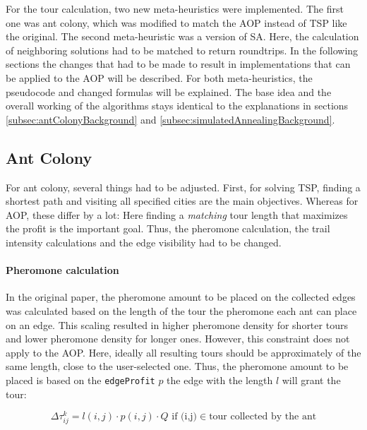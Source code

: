 For the tour calculation, two new meta-heuristics were implemented.
The first one was ant colony, which was modified to match the AOP instead of TSP like the original.
The second meta-heuristic was a version of SA.
Here, the calculation of neighboring solutions had to be matched to return roundtrips.
In the following sections the changes that had to be made to result in implementations that can be applied to the AOP will be described.
For both meta-heuristics, the pseudocode and changed formulas will be explained.
The base idea and the overall working of the algorithms stays identical to the explanations in sections \ref{subsec:antColonyBackground} and \ref{subsec:simulatedAnnealingBackground}.


\subsection{Ant Colony}
\label{subsec:antColonyImplementation}

For ant colony, several things had to be adjusted. 
First, for solving TSP, finding a shortest path and visiting all specified cities are the main objectives.
Whereas for AOP, these differ by a lot:
Here finding a \textit{matching} tour length that maximizes the profit is the important goal. 
Thus, the pheromone calculation, the trail intensity calculations and the edge visibility had to be changed.

\paragraph{Pheromone calculation}

In the original paper, the pheromone amount to be placed on the collected edges was calculated based on the length of the tour the pheromone each ant can place on an edge. 
This scaling resulted in higher pheromone density for shorter tours and lower pheromone density for longer ones.
However, this constraint does not apply to the AOP.
Here, ideally all resulting tours should be approximately of the same length, close to the user-selected one.
Thus, the pheromone amount to be placed is based on the \texttt{edgeProfit} $p$ the edge with the length $l$ will grant the tour:


\begin{equation}
	\label{eq:newPheromoneCalc}
	\Delta\tau_{ij}^k = l(i,j) \cdot p(i,j) \cdot Q \text{ if (i,j)} \in \text{tour collected by the ant}
\end{equation}


